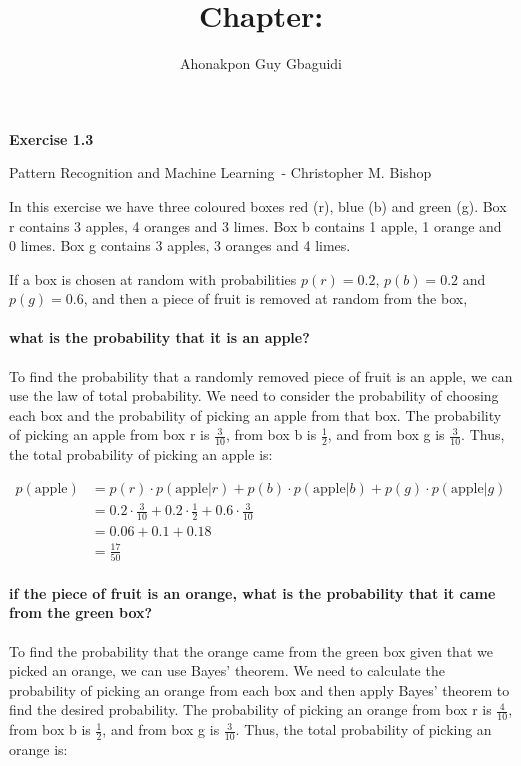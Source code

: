 \documentclass{article}
\title{Chapter: \ChapterName}
\author{Ahonakpon Guy Gbaguidi}
\date{}
\newcommand{\BookName}{Pattern Recognition and Machine Learning}
\newcommand{\BookAuthor}{Christopher M. Bishop}
\newcommand{\ExerciseID}{1.3}
\begin{document}
\maketitle

\begin{center}
  \large\textbf{Exercise \ExerciseID}

  \vspace{0.5em}

  \normalsize\BookName\ - \BookAuthor
\end{center}

\begin{tcolorbox}[breakable,colback=gray!5,colframe=gray!60,title=Solution]
In this exercise we have three coloured boxes red (r), blue (b) and green (g).
Box r contains 3 apples, 4 oranges and 3 limes. 
Box b contains 1 apple, 1 orange and 0 limes. 
Box g contains 3 apples, 3 oranges and 4 limes.

If a box is chosen at random with probabilities $p(r) = 0.2$, $p(b) = 0.2$ and $p(g) = 0.6$, 
and then a piece of fruit is removed at random from the box,

\paragraph{what is the probability that it is an apple?}

To find the probability that a randomly removed piece of fruit is an apple, we can use the law of total probability. We need to consider the probability of choosing each box and the probability of picking an apple from that box.
The probability of picking an apple from box r is $\frac{3}{10}$, from box b is $\frac{1}{2}$, and from box g is $\frac{3}{10}$.
Thus, the total probability of picking an apple is:

\begin{align*}
  p(\text{apple}) &= p(r) \cdot p(\text{apple} | r) + p(b) \cdot p(\text{apple} | b) + p(g) \cdot p(\text{apple} | g) \\
  &= 0.2 \cdot \frac{3}{10} + 0.2 \cdot \frac{1}{2} + 0.6 \cdot \frac{3}{10} \\
  &= 0.06 + 0.1 + 0.18 \\
  &= \frac{17}{50}
\end{align*}

\paragraph{if the piece of fruit is an orange, what is the probability that it came from the green box?}
To find the probability that the orange came from the green box given that we picked an orange, we can use Bayes' theorem. We need to calculate the probability of picking an orange from each box and then apply Bayes' theorem to find the desired probability.
The probability of picking an orange from box r is $\frac{4}{10}$, from box b is $\frac{1}{2}$, and from box g is $\frac{3}{10}$.
Thus, the total probability of picking an orange is:


\end{tcolorbox}
\end{document}
